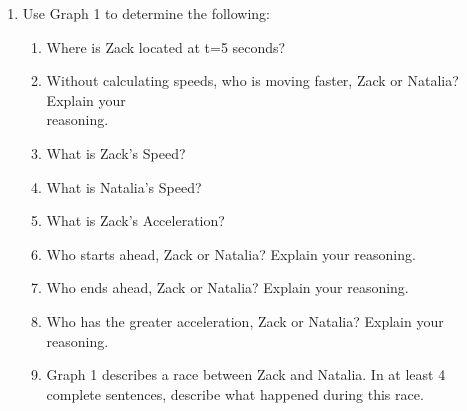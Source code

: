 \documentclass[letterpaper, 12pt]{article}
\begin{document}
\begin{enumerate}
 \item  \vspace{-.2in} Use Graph 1 to determine the following: \vspace{-.1in}
\begin{enumerate}
	\item Where is Zack located at t=5 seconds? \vspace{.25in}
	\item Without calculating speeds, who is moving faster, Zack or Natalia?  Explain your \\ reasoning.\vspace{.25in}
	\item What is Zack's Speed?\vspace{.25in}
	\item What is Natalia's Speed?\vspace{.25in}
	\item What is Zack's Acceleration?\vspace{.25in}
	\item Who starts ahead, Zack or Natalia?  Explain your reasoning.\vspace{.25in}
	\item Who ends ahead, Zack or Natalia?  Explain your reasoning.\vspace{.25in}
	\item Who has the greater acceleration, Zack or Natalia?  Explain your reasoning. \vspace{.25in}
	\item Graph 1 describes a race between Zack and Natalia.  In at least 4 complete sentences, describe what happened during this race. \vspace{1in}
\end{enumerate}

\begin{center}
\end{center}
\end{enumerate}
\end{document}
